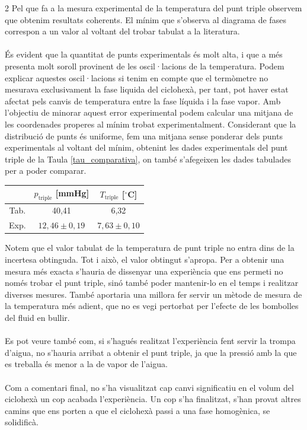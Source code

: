 \documentclass[12pt,twosides,onecolumn,openany]{article}
\newenvironment{Figura}
  {\par\medskip\noindent\minipage{\linewidth}}
  {\endminipage\par\medskip}
\begin{document}
\begin{multicols}{2}
Pel que fa a la mesura experimental de la temperatura del punt triple observem que obtenim resultats coherents. El mínim que s'observa al diagrama de fases correspon a un valor al voltant del trobar tabulat a la literatura.\\\\
És evident que la quantitat de punts experimentals és molt alta, i que a més presenta molt soroll provinent de les oscil·lacions de la temperatura. Podem explicar aquestes oscil·lacions si tenim en compte que el termòmetre no mesurava exclusivament la fase liquida del ciclohexà, per tant, pot haver estat afectat pels canvis de temperatura entre la fase líquida i la fase vapor. Amb l'objectiu de minorar aquest error experimental podem calcular una mitjana de les coordenades properes al mínim trobat experimentalment. Considerant que la distribució de punts és uniforme, fem una mitjana sense ponderar dels punts experimentals al voltant del mínim, obtenint les dades experimentals del punt triple de la Taula \ref{tau_comparativa}, on també s'afegeixen les dades tabulades per a poder comparar.
\renewcommand{\arraystretch}{1.6}
\begin{Figura}
    \centering
    \begin{tabular}{c|c|c}
        & $p_{\text{triple}}$ [mmHg] & $T_{\text{triple}}$ [$^\circ$C] \\
        \hline\hline
        Tab. \cite{punt_triple} & 40,41 & 6,32 \\
        Exp. & $12,46\pm0,19$ & $7,63\pm0,10$
    \end{tabular}
    \label{tau_comparativa}
\end{Figura}
Notem que el valor tabulat de la temperatura de punt triple no entra dins de la incertesa obtinguda. Tot i això, el valor obtingut s'apropa. Per a obtenir una mesura més exacta s'hauria de dissenyar una experiència que ens permeti no només trobar el punt triple, sinó també poder mantenir-lo en el temps i realitzar diverses mesures. També aportaria una millora fer servir un mètode de mesura de la temperatura més adient, que no es vegi pertorbat per l'efecte de les bombolles del fluid en bullir.\\\\
Es pot veure també com, si s'hagués realitzat l'experiència fent servir la trompa d'aigua, no s'hauria arribat a obtenir el punt triple, ja que la pressió amb la que es treballa és menor a la de vapor de l'aigua.\\\\
Com a comentari final, no s'ha visualitzat cap canvi significatiu en el volum del ciclohexà un cop acabada l'experiència. Un cop s'ha finalitzat, s'han provat altres camins que ens porten a que el ciclohexà passi a una fase homogènica, se solidificà.

\end{multicols}
\end{document}
